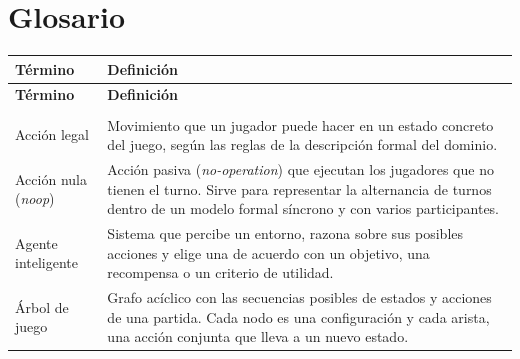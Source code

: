 
\chapter*{Glosario}


\begingroup
\small

\renewcommand{\arraystretch}{1.18}

\begin{longtable}[l]{
    @{}
    >{\raggedright\arraybackslash}p{4.2cm}
    p{\dimexpr\textwidth-4.2cm-2\tabcolsep\relax}
    @{}
    }

    \toprule
    \textbf{Término} & \textbf{Definición}                                \\
    \midrule
    \endfirsthead

    \toprule
    \textbf{Término} & \textbf{Definición}                                \\
    \midrule
    \endhead

    \midrule
    \multicolumn{2}{r}{\small\textit{Continúa en la siguiente página...}} \\
    \endfoot

    \bottomrule
    \endlastfoot

    Acción legal
                     &
    Movimiento que un jugador puede hacer en un estado concreto del juego, según las reglas de la descripción formal del dominio.
    \\

    Acción nula (\textit{noop})
                     &
    Acción pasiva (\textit{no-operation}) que ejecutan los jugadores que no tienen el turno. Sirve para representar la alternancia de turnos dentro de un modelo formal síncrono y con varios participantes.
    \\

    Agente inteligente
                     &
    Sistema que percibe un entorno, razona sobre sus posibles acciones y elige una de acuerdo con un objetivo, una recompensa o un criterio de utilidad.
    \\

    Árbol de juego
                     &
    Grafo acíclico con las secuencias posibles de estados y acciones de una partida. Cada nodo es una configuración y cada arista, una acción conjunta que lleva a un nuevo estado.
    \\


\end{longtable}
